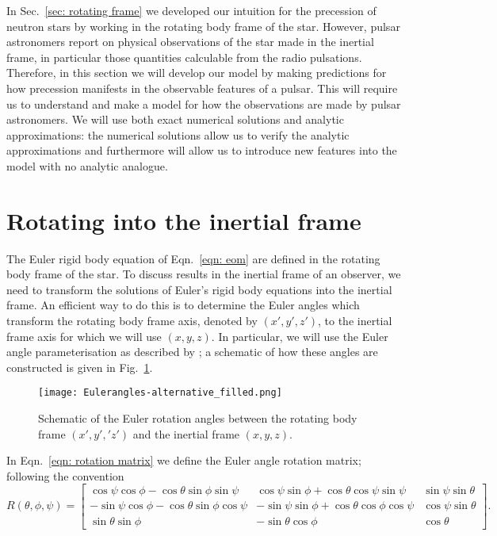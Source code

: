 \documentclass[../full_thesis/full_thesis.tex]{subfiles}
\begin{document}
In Sec.~\ref{sec: rotating frame} we developed our intuition for the precession
of neutron stars by working in the rotating body frame of the star.  However,
pulsar astronomers report on physical observations of the star made in the
inertial frame, in particular those quantities calculable from the radio
pulsations. Therefore, in this section we will develop our model by making
predictions for how precession manifests in the observable features of a
pulsar. This will require us to understand and make a model for how the
observations are made by pulsar astronomers.  We will use both exact numerical
solutions and analytic approximations: the numerical solutions allow us to
verify the analytic approximations and furthermore will allow us to introduce
new features into the model with no analytic analogue.

\section{Rotating into the inertial frame}

The Euler rigid body equation of Eqn.~\eqref{eqn: eom} are defined in the
rotating body frame of the star. To discuss results in the inertial frame of
an observer, we need to transform the solutions of Euler's rigid body equations
into the inertial frame.  An efficient way to do this
is to determine the Euler angles which transform the rotating body frame axis,
denoted by $(x',y', z')$, to the inertial frame axis for which we will use $(x,
y, z)$. In particular, we will use the Euler angle parameterisation as described by
\citet{Landau1969}; a schematic of how these angles are constructed is given in
Fig.~\ref{fig: Euler}.
\begin{figure}[ht]
\centering
\texttt{[image: Eulerangles-alternative\_filled.png]}
\caption{Schematic of the Euler rotation angles between the rotating body
frame $(x', y', 'z')$ and the inertial frame $(x, y, z)$.}
\label{fig: Euler}
\end{figure}

In Eqn.~\eqref{eqn: rotation matrix} we define the Euler angle rotation matrix;
following the \citet{Landau1969} convention
\begin{equation}
R(\theta, \phi, \psi) = \left[
\begin{array}{ccc}
\cos\psi \cos\phi - \cos\theta \sin\phi \sin \psi &
\cos\psi \sin \phi + \cos\theta \cos \psi \sin \psi &
\sin \psi \sin\theta \\
-\sin\psi \cos\phi - \cos\theta\sin\phi\cos\psi &
-\sin\psi\sin\phi + \cos\theta\cos\phi\cos\psi &
\cos\psi \sin\theta \\
\sin\theta\sin\phi &
-\sin\theta \cos\phi &
\cos\theta
\end{array}
\right].
\label{eqn: rotation matrix}
\end{equation}
\end{document}
